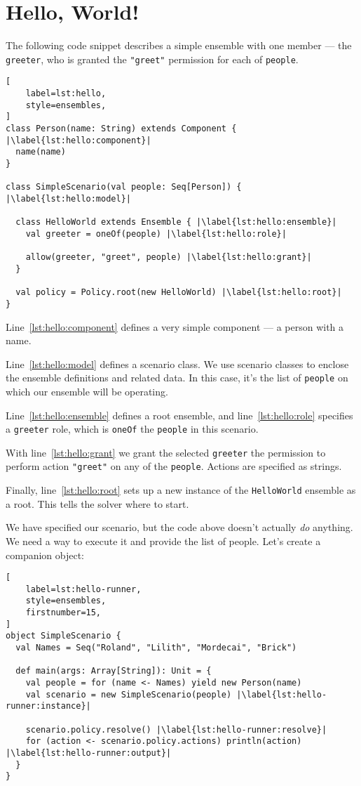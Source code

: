 \section{Hello, World!}
\label{dsl:hello}

The following code snippet describes a simple ensemble with one member --- the
\lstinline{greeter}, who is granted the \lstinline{"greet"} permission for each of
\lstinline{people}.

\begin{lstlisting}[
    label=lst:hello,
    style=ensembles,
]
class Person(name: String) extends Component { |\label{lst:hello:component}|
  name(name)
}

class SimpleScenario(val people: Seq[Person]) { |\label{lst:hello:model}|

  class HelloWorld extends Ensemble { |\label{lst:hello:ensemble}|
    val greeter = oneOf(people) |\label{lst:hello:role}|

    allow(greeter, "greet", people) |\label{lst:hello:grant}|
  }

  val policy = Policy.root(new HelloWorld) |\label{lst:hello:root}|
}
\end{lstlisting}

Line~\ref{lst:hello:component} defines a very simple component --- a person with a name.

Line~\ref{lst:hello:model} defines a scenario class. We use scenario classes to enclose
the ensemble definitions and related data. In this case, it's the list of
\lstinline{people} on which our ensemble will be operating.

Line~\ref{lst:hello:ensemble} defines a root ensemble, and line~\ref{lst:hello:role}
specifies a \lstinline{greeter} role, which is \lstinline{oneOf} the \lstinline{people}
in this scenario.

With line~\ref{lst:hello:grant} we grant the selected \lstinline{greeter} the permission
to perform action \lstinline{"greet"} on any of the \lstinline{people}. Actions are
specified as strings.

Finally, line~\ref{lst:hello:root} sets up a new instance of the \lstinline{HelloWorld}
ensemble as a root. This tells the solver where to start.

\bigskip

We have specified our scenario, but the code above doesn't actually \textit{do} anything.
We need a way to execute it and provide the list of people. Let's create a companion
object:

\begin{lstlisting}[
    label=lst:hello-runner,
    style=ensembles,
    firstnumber=15,
]
object SimpleScenario {
  val Names = Seq("Roland", "Lilith", "Mordecai", "Brick")

  def main(args: Array[String]): Unit = {
    val people = for (name <- Names) yield new Person(name)
    val scenario = new SimpleScenario(people) |\label{lst:hello-runner:instance}|

    scenario.policy.resolve() |\label{lst:hello-runner:resolve}|
    for (action <- scenario.policy.actions) println(action) |\label{lst:hello-runner:output}|
  }
}
\end{lstlisting}

